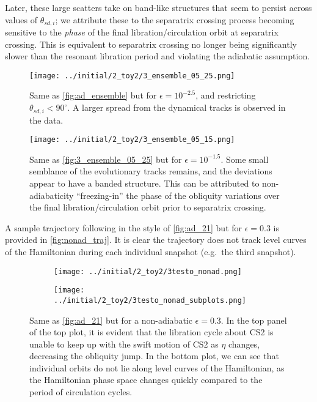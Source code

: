 \documentclass[
        fleqn,
        usenatbib,
        referee,
    ]{mnras}
\begin{document}
Later, these large scatters take on band-like structures that seem to persist
across values of $\theta_{sd, i}$; we attribute these to the separatrix crossing
process becoming sensitive to the \emph{phase} of the final
libration/circulation orbit at separatrix crossing. This is equivalent to
separatrix crossing no longer being significantly slower than the resonant
libration period and violating the adiabatic assumption.
\begin{figure}
    \centering
    \texttt{[image: ../initial/2\_toy2/3\_ensemble\_05\_25.png]}
    \caption{Same as \autoref{fig:ad_ensemble} but for $\epsilon = 10^{-2.5}$,
    and restricting $\theta_{sd, i} < 90^\circ$. A larger spread from the
    dynamical tracks is observed in the data.}\label{fig:3_ensemble_05_25}
\end{figure}
\begin{figure}
    \centering
    \texttt{[image: ../initial/2\_toy2/3\_ensemble\_05\_15.png]}
    \caption{Same as \autoref{fig:3_ensemble_05_25} but for $\epsilon =
    10^{-1.5}$. Some small semblance of the evolutionary tracks remains, and the
    deviations appear to have a banded structure. This can be attributed to
    non-adiabaticity ``freezing-in'' the phase of the obliquity variations over
    the final libration/circulation orbit prior to separatrix
    crossing.}\label{fig:3_ensemble_05_15}
\end{figure}

A sample trajectory following in the style of \autoref{fig:ad_21} but for
$\epsilon = 0.3$ is provided in \autoref{fig:nonad_traj}. It is clear the
trajectory does not track level curves of the Hamiltonian during each individual
snapshot (e.g.\ the third snapshot).
\begin{figure}
    \centering
    \begin{subfigure}{\columnwidth}
        \centering
        \texttt{[image: ../initial/2\_toy2/3testo\_nonad.png]}
    \end{subfigure}
    \begin{subfigure}{\columnwidth}
        \centering
        \texttt{[image: ../initial/2\_toy2/3testo\_nonad\_subplots.png]}
    \end{subfigure}
    \caption{Same as \autoref{fig:ad_21} but for a non-adiabatic $\epsilon =
    0.3$. In the top panel of the top plot, it is evident that the libration
    cycle about CS2 is unable to keep up with the swift motion of CS2 as $\eta$
    changes, decreasing the obliquity jump. In the bottom plot, we can see that
    individual orbits do not lie along level curves of the Hamiltonian, as the
    Hamiltonian phase space changes quickly compared to the period of
    circulation cycles.}\label{fig:nonad_traj}
\end{figure}
\end{document}
